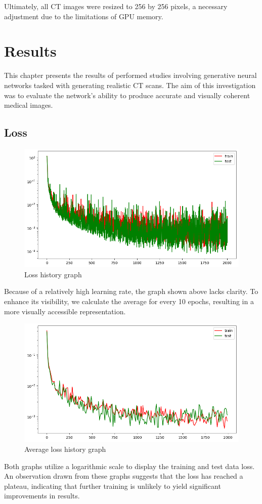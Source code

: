 \documentclass[11pt,a4paper]{report}
\begin{document}
Ultimately, all CT images were resized to 256 by 256 pixels, a necessary adjustment due to the limitations of GPU memory.


\chapter{Results}
This chapter presents the results of performed studies involving generative neural networks tasked with generating realistic CT scans. The aim of this investigation was to evaluate the network's ability to produce accurate and visually coherent medical images.

\section{Loss}
\begin{figure}[H]
	\centering
	\includegraphics[scale=0.6]{images/loss}
    \caption{Loss history graph}
\end{figure}
Because of a relatively high learning rate, the graph shown above lacks clarity. To enhance its visibility, we calculate the average for every 10 epochs, resulting in a more visually accessible representation.
\begin{figure}[H]
	\centering
	\includegraphics[scale=0.6]{images/loss_10}
    \caption{Average loss history graph}
\end{figure}
Both graphs utilize a logarithmic scale to display the training and test data loss. An observation drawn from these graphs suggests that the loss has reached a plateau, indicating that further training is unlikely to yield significant improvements in results.
\end{document}
